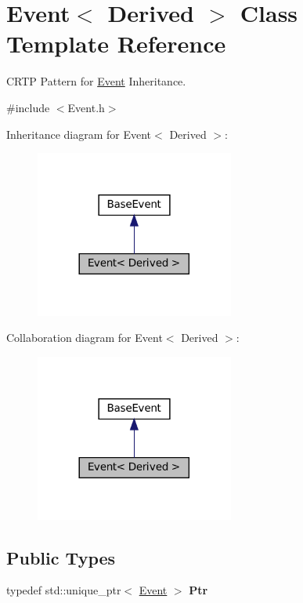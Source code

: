 \hypertarget{classEvent}{}\section{Event$<$ Derived $>$ Class Template Reference}
\label{classEvent}


C\+R\+TP Pattern for \hyperlink{classEvent}{Event} Inheritance.  




{\ttfamily \#include $<$Event.\+h$>$}



Inheritance diagram for Event$<$ Derived $>$\+:
\nopagebreak
\begin{figure}[H]
\begin{center}
\leavevmode
\includegraphics[width=185pt]{classEvent__inherit__graph}
\end{center}
\end{figure}


Collaboration diagram for Event$<$ Derived $>$\+:
\nopagebreak
\begin{figure}[H]
\begin{center}
\leavevmode
\includegraphics[width=185pt]{classEvent__coll__graph}
\end{center}
\end{figure}
\subsection*{Public Types}
\begin{DoxyCompactItemize}
\item 
\mbox{\label{classEvent_a05cd2012a9acae50352453b73bb8debd}} 
typedef std\+::unique\+\_\+ptr$<$ \hyperlink{classEvent}{Event} $>$ {\bfseries Ptr}
\end{DoxyCompactItemize}
